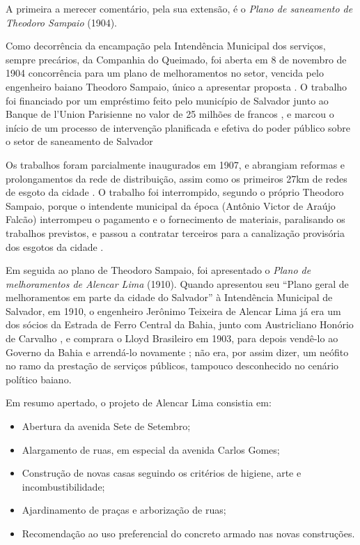 A primeira a merecer comentário, pela sua extensão, é o \textit{Plano de saneamento de Theodoro Sampaio} (1904).

Como decorrência da encampação pela Intendência Municipal dos serviços, sempre precários, da Companhia do Queimado, foi aberta em 8 de novembro de 1904 concorrência para um plano de melhoramentos no setor, vencida pelo engenheiro baiano Theodoro Sampaio, único a apresentar proposta \cite[150]{gordilhobarbosa_eau_2004}. O trabalho foi financiado por um empréstimo feito pelo município de Salvador junto ao Banque de l'Union Parisienne no valor de 25 milhões de francos \cite[p.~150]{gordilhobarbosa_eau_2004}, e marcou o início de um processo de intervenção planificada e efetiva do poder público sobre o setor de saneamento de Salvador \cite[p.~150]{gordilhobarbosa_eau_2004} 

Os trabalhos foram parcialmente inaugurados em 1907, e abrangiam reformas e prolongamentos da rede de distribuição, assim como os primeiros 27km de redes de esgoto da cidade \cite[p.~151]{gordilhobarbosa_eau_2004}. O trabalho foi interrompido, segundo o próprio Theodoro Sampaio, porque o intendente municipal da época (Antônio Victor de Araújo Falcão) interrompeu o pagamento e o fornecimento de materiais, paralisando os trabalhos previstos, e passou a contratar terceiros para a canalização provisória dos esgotos da cidade \cite[p.~152]{gordilhobarbosa_eau_2004}.

Em seguida ao plano de Theodoro Sampaio, foi apresentado o \textit{Plano de melhoramentos de Alencar Lima} (1910). Quando apresentou seu ``Plano geral de melhoramentos em parte da cidade do Salvador'' à Intendência Municipal de Salvador, em 1910, o engenheiro Jerônimo Teixeira de Alencar Lima já era um dos sócios da Estrada de Ferro Central da Bahia, junto com Austricliano Honório de Carvalho \cite{souza_trabalholivre_2011}, e comprara o Lloyd Brasileiro em 1903, para depois vendê-lo ao Governo da Bahia e arrendá-lo novamente \cite[p.~220]{CUNHA2011}; não era, por assim dizer, um neófito no ramo da prestação de serviços públicos, tampouco desconhecido no cenário político baiano.

Em resumo apertado, o projeto de Alencar Lima consistia em:

\begin{itemize}
\item Abertura da avenida Sete de Setembro;
\item Alargamento de ruas, em especial da avenida Carlos Gomes;
\item Construção de novas casas seguindo os critérios de higiene, arte e incombustibilidade;
\item Ajardinamento de praças e arborização de ruas;
\item Recomendação ao uso preferencial do concreto armado nas novas construções.
\end{itemize}

